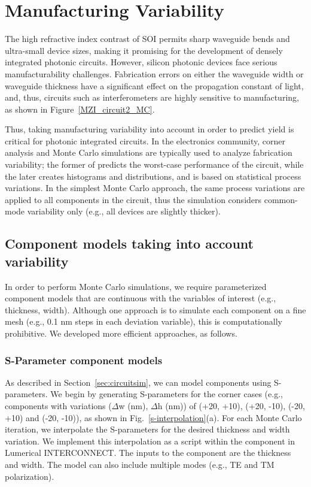 \documentclass[journal]{spie}
\begin{document}
\section{Manufacturing Variability}
\label{sec:variability}
The high refractive index contrast of SOI permits sharp waveguide bends and ultra-small device sizes, making it promising for the development of densely integrated photonic circuits. However, silicon photonic devices face serious manufacturability challenges. Fabrication errors on either the waveguide width or waveguide thickness have a significant effect on the propagation constant of light, and, thus, circuits such as interferometers are highly sensitive to manufacturing, as shown in Figure~\ref{MZI_circuit2_MC}.

Thus, taking manufacturing variability into account in order to predict yield is critical for photonic integrated circuits. In the electronics community, corner analysis and Monte Carlo simulations are typically used to analyze fabrication variability; the former of predicts the worst-case performance of the circuit, while the later creates histograms and distributions, and is based on statistical process variations.  In the simplest Monte Carlo approach, the same process variations are applied to all components in the circuit, thus the simulation considers common-mode variability only (e.g., all devices are slightly thicker).  

\subsection{Component models taking into account variability}
In order to perform Monte Carlo simulations, we require parameterized component models that are continuous with the variables of interest (e.g., thickness, width).  Although one approach is to simulate each component on a fine mesh (e.g., 0.1 nm steps in each deviation variable), this is computationally prohibitive.  We developed more efficient approaches, as follows.

\subsubsection{S-Parameter component models}
\label{SparamModel}
As described in Section~\ref{sec:circuitsim}, we can model components using S-parameters.  
We begin by generating S-parameters for the corner cases (e.g., components with variations ($\Delta$w (nm), $\Delta$h (nm)) of (+20, +10), (+20, -10), (-20, +10) and (-20, -10)), as shown in Fig.~\ref{s-interpolation}(a).  For each Monte Carlo iteration, we interpolate the S-parameters for the desired thickness and width variation.  We implement this interpolation as a script within the component in Lumerical INTERCONNECT.  The inputs to the component are the thickness and width.
The model can also include multiple modes (e.g., TE and TM polarization).
\end{document}
